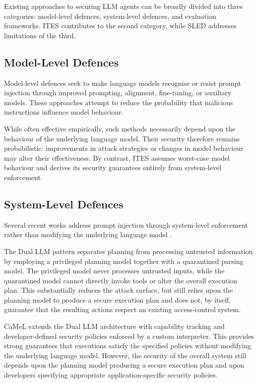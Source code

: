 \documentclass{article} %
\begin{document}
Existing approaches to securing LLM agents can be broadly divided into three categories: model-level defences, system-level defences, and evaluation frameworks. ITES contributes to the second category, while SLED addresses limitations of the third.

\subsection{Model-Level Defences}

Model-level defences seek to make language models recognise or resist prompt injection through improved prompting, alignment, fine-tuning, or auxiliary models. These approaches attempt to reduce the probability that malicious instructions influence model behaviour.

While often effective empirically, such methods necessarily depend upon the behaviour of the underlying language model. Their security therefore remains probabilistic: improvements in attack strategies or changes in model behaviour may alter their effectiveness. By contrast, ITES assumes worst-case model behaviour and derives its security guarantees entirely from system-level enforcement.

\subsection{System-Level Defences}

Several recent works address prompt injection through system-level enforcement rather than modifying the underlying language model \cite{debenedetti2025defeatingpromptinjectionsdesign, wu2024systemleveldefenseindirectprompt, beurerkellner2025designpatternssecuringllm}.

The Dual LLM pattern separates planning from processing untrusted information by employing a privileged planning model together with a quarantined parsing model. The privileged model never processes untrusted inputs, while the quarantined model cannot directly invoke tools or alter the overall execution plan. This substantially reduces the attack surface, but still relies upon the planning model to produce a secure execution plan and does not, by itself, guarantee that the resulting actions respect an existing access-control system.

CaMeL extends the Dual LLM architecture with capability tracking and developer-defined security policies enforced by a custom interpreter. This provides strong guarantees that executions satisfy the specified policies without modifying the underlying language model. However, the security of the overall system still depends upon the planning model producing a secure execution plan and upon developers specifying appropriate application-specific security policies.
\end{document}

